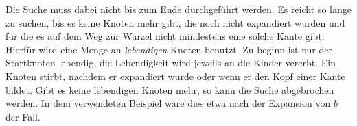 Die Suche muss dabei nicht bis zum Ende durchgeführt werden.
Es reicht so lange zu suchen, bis es keine Knoten mehr gibt, die noch nicht expandiert wurden und für die es auf dem Weg zur Wurzel nicht mindestens eine solche Kante gibt.
Hierfür wird eine Menge an \emph{lebendigen} Knoten benutzt.
Zu beginn ist nur der Startknoten lebendig, die Lebendigkeit wird jeweils an die Kinder vererbt.
Ein Knoten stirbt, nachdem er expandiert wurde oder wenn er den Kopf einer Kante bildet.
Gibt es keine lebendigen Knoten mehr, so kann die Suche abgebrochen werden.
In dem verwendeten Beispiel wäre dies etwa nach der Expansion von $b$ der Fall.


% 
% 
% 
% 
% 
% 
% 
% 
% 
% 
% 

